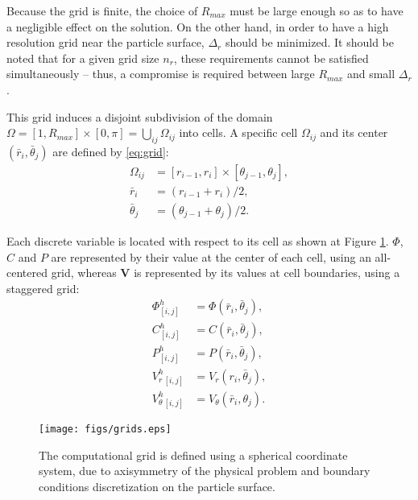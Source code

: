 \documentclass[MSc,beforeExam]{iitcsthesis}
\newcommand\bV{\boldsymbol{V}}
\begin{document}
Because the grid is finite, the choice of $R_{max}$ must be large enough 
so as to have a negligible effect on the solution. 
On the other hand, in order to have a high resolution grid near the particle surface,
$\Delta_r$ should be minimized. It should be noted that for a given grid size $n_r$,
these requirements cannot be satisfied simultaneously -- thus, a compromise is required
between large $R_{max}$ and small $\Delta_r$.

This grid induces a disjoint subdivision of the domain 
$\Omega = [1, R_{max}] \times [0,\pi] = \bigcup_{ij}\Omega_{ij}$ into cells.
A specific cell $\Omega_{ij}$ and its center $(\bar{r}_i, \bar{\theta}_j)$ are defined by \eqref{eq:grid}:
\begin{align}
\nonumber
\Omega_{ij} &= [r_{i-1}, r_{i}] \times [\theta_{j-1}, \theta_{j}], \\
\bar{r}_i &= (r_{i-1} + r_{i})/2, \\
\nonumber
\bar{\theta}_j &= (\theta_{j-1} + \theta_{j})/2.
\end{align}

Each discrete variable is located with respect to its cell 
as shown at Figure \ref{fig:grids}.
$\varPhi$, $C$ and $P$ are represented by their value at the center of each cell, 
using an all-centered grid, whereas $\bV$ is represented by its values at cell 
boundaries, using a staggered grid:
\begin{align}
\nonumber \varPhi^h_{[i,j]} &= \varPhi(\bar{r}_i, \bar{\theta}_j), \\
\nonumber C^h_{[i,j]} &= C(\bar{r}_i, \bar{\theta}_j), \\
P^h_{[i,j]} &= P(\bar{r}_i, \bar{\theta}_j), \\
\nonumber V_r^h{}_{[i,j]} &= V_r(r_i, \bar{\theta}_j), \\
\nonumber V_\theta^h{}_{[i,j]} &= V_\theta(\bar{r}_i, {\theta}_j).
\end{align}
\begin{figure}[h]
    \begin{center}
	\texttt{[image: figs/grids.eps]}
        \caption[Computational grid]{The computational grid is defined using
        a spherical coordinate system, due to axisymmetry of the physical problem
        and boundary conditions discretization on the particle surface.}
    \label{fig:grids}
    \end{center}
\end{figure}
\end{document}
